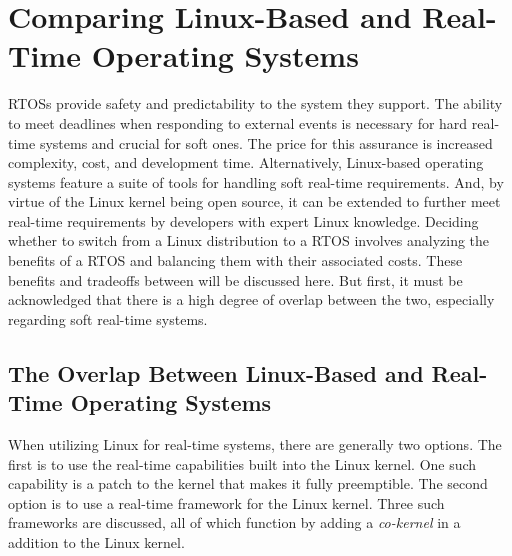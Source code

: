 \section{\sloppy Comparing Linux-Based and Real-Time Operating Systems}
\markboth{}{}
    RTOSs provide safety and predictability to the system they support.
    The ability to meet deadlines when responding to external events is
        necessary for hard real-time systems and crucial for soft ones.
    The price for this assurance is increased complexity, cost, and development
        time.
    Alternatively, Linux-based operating systems feature a suite of tools for
        handling soft real-time requirements.
    And, by virtue of the Linux kernel being open source, it can be extended to
        further meet real-time requirements by developers with expert Linux
        knowledge.
    Deciding whether to switch from a Linux distribution to a RTOS involves
        analyzing the benefits of a RTOS and balancing them with their
        associated costs.
    These benefits and tradeoffs between will be discussed here.
    But first, it must be acknowledged that there is a high degree of overlap
        between the two, especially regarding soft real-time systems.

        \subsection{The Overlap Between Linux-Based and Real-Time Operating Systems}
        \markboth{}{}
            When utilizing Linux for real-time systems, there are generally two
                options.
            The first is to use the real-time capabilities built into the Linux
                kernel.
            One such capability is a patch to the kernel that makes it fully
                preemptible.
            The second option is to use a real-time framework for the Linux
                kernel.
            Three such frameworks are discussed, all of which function by adding
                a \textit{co-kernel} in a addition to the Linux kernel.

